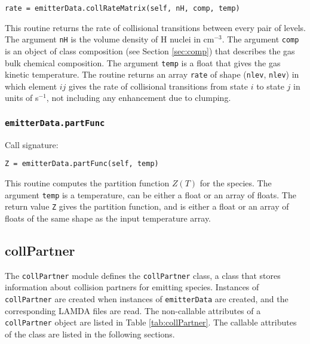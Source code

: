 \documentclass[12pt]{article}
\begin{document}
\begin{verbatim}
rate = emitterData.collRateMatrix(self, nH, comp, temp)
\end{verbatim}

This routine returns the rate of collisional transitions between every pair of levels. The argument \verb=nH= is the volume density of H nuclei in cm$^{-3}$. The argument \verb=comp= is an object of class composition (see Section \ref{sec:comp}) that describes the gas bulk chemical composition. The argument \verb=temp= is a float that gives the gas kinetic temperature. The routine returns an array \verb=rate= of shape (\verb=nlev=, \verb=nlev=) in which element $ij$ gives the rate of collisional transitions from state $i$ to state $j$ in units of s$^{-1}$, not including any enhancement due to clumping.


\subsubsection{\texttt{emitterData.partFunc}}

Call signature:

\begin{verbatim}
Z = emitterData.partFunc(self, temp)
\end{verbatim}

This routine computes the partition function $Z(T)$ for the species. The argument \verb=temp= is a temperature, can be either a float or an array of floats. The return value \verb=Z= gives the partition function, and is either a float or an array of floats of the same shape as the input temperature array.

\clearpage

\subsection{collPartner}
\label{sec:collPatner}

The \verb=collPartner= module defines the \verb=collPartner= class, a class that stores information about collision partners for emitting species. Instances of \verb=collPartner= are created when instances of \verb=emitterData= are created, and the corresponding LAMDA files are read. The non-callable attributes of a \verb=collPartner= object are listed in Table \ref{tab:collPartner}. The callable attributes of the class are listed in the following sections.
\end{document}
